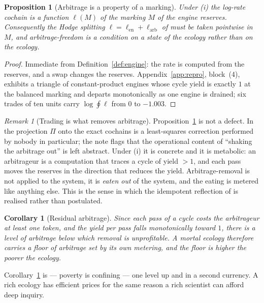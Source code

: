 \documentclass[11pt]{article}
\theoremstyle{plain}
\newtheorem{proposition}[theorem]{Proposition}
\newtheorem{corollary}[theorem]{Corollary}
\theoremstyle{definition}
\theoremstyle{remark}
\newtheorem{remark}[theorem]{Remark}
\begin{document}
\begin{proposition}[Arbitrage is a property of a marking]\label{prop:marking}
Under (i) the log-rate cochain is a function $\ell(M)$ of the marking $M$
of the engine reserves. Consequently the Hodge splitting
$\ell = \ell_{\mathrm{en}} + \ell_{\mathrm{arb}}$ of \cite[\S4]{vtok} must
be taken pointwise in $M$, and arbitrage-freedom is a condition on a
\emph{state} of the ecology rather than on the ecology.
\end{proposition}

\begin{proof}
Immediate from Definition~\ref{def:engine}: the rate is computed from the
reserves, and a swap changes the reserves. Appendix~\ref{app:repro},
block~(4), exhibits a triangle of constant-product engines whose cycle
yield is exactly $1$ at the balanced marking and departs monotonically as
one engine is drained; six trades of ten units carry
$\log \oint \ell$ from $0$ to $-1.003$.
\end{proof}

\begin{remark}[Trading is what removes arbitrage]
Proposition~\ref{prop:marking} is not a defect. In \cite{vtok} the
projection $\Pi$ onto the exact cochains is a least-squares correction
performed by nobody in particular; the note flags that the operational
content of ``shaking the arbitrage out'' is left abstract. Under (i) it is
concrete and it is metabolic: an arbitrageur is a computation that traces a
cycle of yield $> 1$, and each pass moves the reserves in the direction
that reduces the yield. Arbitrage-removal is not applied to the system, it
is \emph{eaten out} of the system, and the eating is metered like anything
else. This is the sense in which the idempotent reflection of
\cite[Prop.~3.4]{vtok} is realised rather than postulated.
\end{remark}

\begin{corollary}[Residual arbitrage]\label{cor:residual}
Since each pass of a cycle costs the arbitrageur at least one token, and
the yield per pass falls monotonically toward $1$, there is a level of
arbitrage below which removal is unprofitable. A mortal ecology therefore
carries a floor of arbitrage set by its own metering, and the floor is
higher the poorer the ecology.
\end{corollary}

Corollary~\ref{cor:residual} is \cite[Cor.~19]{scientist} --- poverty is
confining --- one level up and in a second currency. A rich ecology has
efficient prices for the same reason a rich scientist can afford deep
inquiry.
\end{document}
